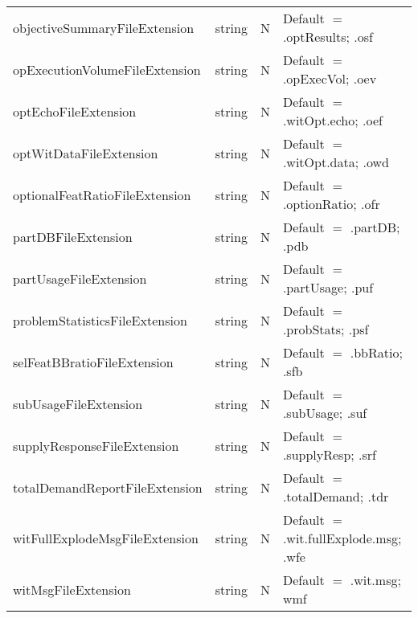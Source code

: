 \begin{tabular}{lllp{3.5in}}
objectiveSummaryFileExtension & string & N & Default $=$ .optResults; .osf \\
opExecutionVolumeFileExtension & string & N & Default $=$ .opExecVol; .oev \\
optEchoFileExtension & string & N & Default $=$ .witOpt.echo; .oef \\
optWitDataFileExtension & string & N & Default $=$ .witOpt.data; .owd \\
optionalFeatRatioFileExtension & string & N & Default $=$ .optionRatio; .ofr \\
partDBFileExtension & string & N & Default $=$ .partDB; .pdb \\
partUsageFileExtension & string & N & Default $=$ .partUsage; .puf \\
problemStatisticsFileExtension & string & N & Default $=$ .probStats; .psf \\
selFeatBBratioFileExtension & string & N & Default $=$ .bbRatio; .sfb \\
subUsageFileExtension & string & N & Default $=$ .subUsage; .suf \\
supplyResponseFileExtension & string & N & Default $=$ .supplyResp; .srf \\
totalDemandReportFileExtension & string & N & Default $=$ .totalDemand; .tdr \\
witFullExplodeMsgFileExtension & string & N & Default $=$ .wit.fullExplode.msg; .wfe\\
witMsgFileExtension & string & N & Default $=$ .wit.msg; wmf \\
\end{tabular}


